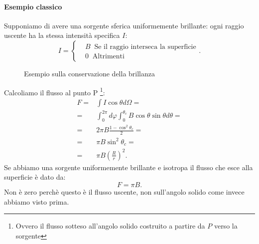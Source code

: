 \paragraph{Esempio classico}%
Supponiamo di avere una sorgente sferica uniformemente brillante: ogni raggio uscente ha la stessa intensità specifica $I$:
 \[
	I = \begin{cases}
		&B  \ \text{ Se il raggio interseca la superficie}\\
		&0 \ \text{ Altrimenti}
	\end{cases}
.\] 
\begin{figure}[H]
    \centering
    \caption{Esempio sulla conservazione della brillanza}
    \label{fig:esempio-su-conservazione-della-brillanza}
\end{figure}
\noindent
Calcoliamo il flusso al punto P \footnote{Ovvero il flusso sotteso all'angolo solido costruito a partire da $P$ verso la sorgente}:
\begin{align*}
	F =& \int I\cos\theta d\Omega=\\
	  =&\int_{0}^{2\pi}d\varphi \int_{0}^{\theta_{c}}B \cos\theta\sin\theta d\theta =\\
	  =&2\pi B\frac{1-\cos^2\theta_{c}}{2}=\\
	  =&\pi B \sin^2\theta_{c}=\\
	  =&\pi B \left( \frac{R}{r} \right) ^2
.\end{align*}
Se abbiamo una sorgente uniformemente brillante e isotropa il flusso che esce alla superficie è dato da:
\[
	F = \pi B
.\] 
Non è zero perchè questo è il flusso uscente, non sull'angolo solido come invece abbiamo visto prima.\\
